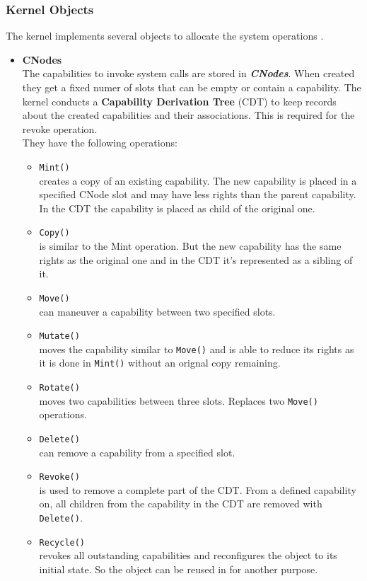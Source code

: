 \subsubsection{Kernel Objects}\label{sec:KernelObjects}
The kernel implements several objects to allocate the system operations \cite{Manual}.
\begin{itemize}
\item \textbf{CNodes} \\
The capabilities to invoke system calls are stored in \textbf{\textit{CNodes}}. When created they get a fixed numer of slots that can be empty or contain a capability. 
The kernel conducts a \textbf{Capability Derivation Tree} (CDT) to keep records about the created capabilities and their associations. This is required for the revoke operation. \\ 
They have the following operations:
\begin{itemize}
\item \texttt{Mint()} \\
creates a copy of an existing capability. The new capability is placed in a specified CNode slot and may have less rights than the parent capability. In the CDT the capability is placed as child of the original one. 
\item \texttt{Copy()} \\
is similar to the Mint operation. But the new capability has the same rights as the original one and in the CDT it's represented as a sibling of it. 
\item \texttt{Move()} \\
can maneuver a capability between two specified slots. 
\item \texttt{Mutate()} \\
moves the capability similar to \texttt{Move()} and is able to reduce its rights as it is done in \texttt{Mint()} without an orignal copy remaining.
\item \texttt{Rotate()} \\
moves two capabilities between three slots. Replaces two \texttt{Move()} operations. 
\item \texttt{Delete()} \\
can remove a capability from a specified slot.
\item \texttt{Revoke()} \\
is used to remove a complete part of the CDT. From a defined capability on, all children from the capability in the CDT are removed with \texttt{Delete()}. 
\item \texttt{Recycle()} \\
revokes all outstanding capabilities and reconfigures the object to its initial state. So the object can be reused in for another purpose.
\end{itemize}


\end{itemize}
